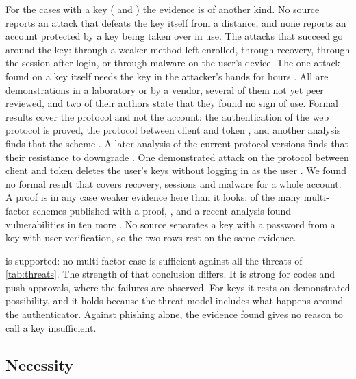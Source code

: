 For the cases with a key ( and ) the evidence is of
another kind.
No source reports an attack that defeats the key itself from a
distance, and none reports an account protected by a key being taken
over in use.
The attacks that succeed go around the key: through a weaker method
left enrolled, through recovery, through the session after login, or
through malware on the user's device.
The one attack found on a key itself needs the key in the attacker's
hands for hours \autocite{Roche2021Titan}.
All are demonstrations in a laboratory or by a vendor, several of them
not yet peer reviewed, and two of their authors state that they found
no sign of use.
Formal results cover the protocol and not the account: the
authentication of the web protocol is proved, the protocol between
client and token
, and another analysis finds that the scheme
.
A later analysis of the current protocol versions finds that their
resistance to downgrade
.
One demonstrated attack on the protocol between client and token deletes
the user's keys without logging in as the user
\autocite{Casagrande2025CTRAPS}.
We found no formal result that covers recovery, sessions and malware
for a whole account.
A proof is in any case weaker evidence here than it looks: of the many
multi-factor schemes published with a proof,
, and a recent analysis found
vulnerabilities in ten more \autocite{Ang2025Excavating}.
No source separates a key with a password from a key with user
verification, so the two rows rest on the same evidence.

 is supported: no multi-factor case is sufficient
against all the threats of \cref{tab:threats}.
The strength of that conclusion differs.
It is strong for codes and push approvals, where the failures are
observed.
For keys it rests on demonstrated possibility, and it holds because the
threat model includes what happens around the authenticator.
Against phishing alone, the evidence found gives no reason to call a
key insufficient.

\subsection{Necessity}\label{sec:res-necessary}

